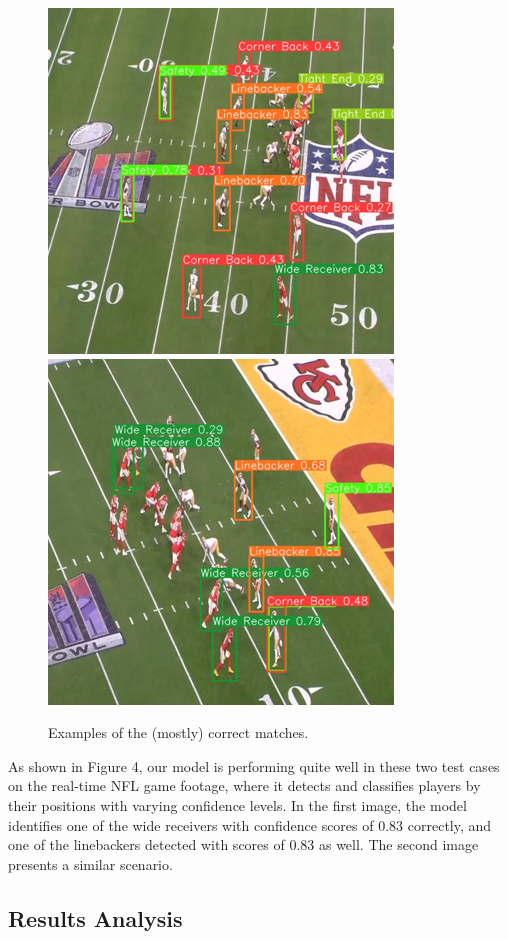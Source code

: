  \begin{figure}[t]
    \centering
    \includegraphics[width=0.4\linewidth]{matches_1.png}
    \includegraphics[width=0.4\linewidth]{matches_2.png}
    \caption{Examples of the (mostly) correct matches.}
    \label{fig:result2}
\end{figure}

As shown in Figure 4, our model is performing quite well in these two test cases on the real-time NFL game footage, where it detects and classifies players by their positions with varying confidence levels. In the first image, the model identifies one of the wide receivers with confidence scores of  0.83 correctly, and one of the linebackers detected with scores of 0.83 as well. The second image presents a similar scenario. 

\subsection{Results Analysis}

